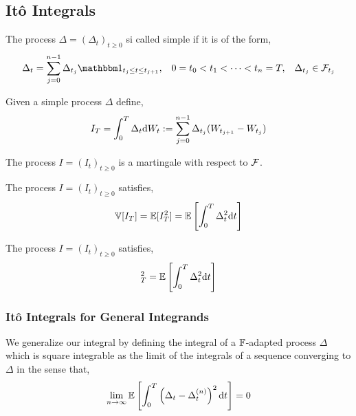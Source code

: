 \documentclass[12pt]{article}
\begin{document}
\subsection{It\^o Integrals}

\begin{definition}
The process \( \Delta = (\Delta_t)_{t\geq 0} \) si called simple if it is of the form,
\begin{align*}
    \Delta_t = \sum_{j=0}^{n-1}\Delta_{t_j} \bOne_{t_j\leq t \leq t_{j+1}}, && 0 = t_0 <t_1<\cdots <t_n = T, && \Delta_{t_j}\in\cF_{t_j}
\end{align*}
\end{definition}

\begin{definition}
Given a simple process \( \Delta \) define,
\begin{align*}
    I_T = \int_0^T \Delta_t \mathrm{d} W_t := \sum_{j=0}^{n-1} \Delta_{t_j} (W_{t_{j+1}} - W_{t_j})
\end{align*}
\end{definition}

\begin{theorem}
The process \( I = (I_t)_{t\geq 0} \) is a martingale with respect to \( \mathcal{F} \).
\end{theorem}

\begin{theorem}
The process \( I = (I_t)_{t\geq 0} \) satisfies,
\begin{align*}
    \mathbb{V}[I_T] = \mathbb{E}[I_T^2] = \mathbb{E} \left[ \int_0^T \Delta_t^2 \mathrm{d} t \right]
\end{align*}
\end{theorem}

\begin{theorem}
The process \( I = (I_t)_{t\geq 0} \) satisfies,
\begin{align*}
    [I,I]_T^2 = \EE \left[ \int_0^T \Delta_t^2 \d t \right]
\end{align*}
\end{theorem}

\subsubsection{It\^o Integrals for General Integrands}

We generalize our integral by defining the integral of a \( \mathbb{F} \)-adapted process \( \Delta  \) which is square integrable as the limit of the integrals of a sequence converging to \( \Delta \) in the sense that,
\begin{align*}
    \lim_{n\to\infty} \mathbb{E} \left[ \int_0^T \left( \Delta_t - \Delta_t^{(n)} \right)^2 \mathrm{d} t \right] = 0
\end{align*}
\end{document}

